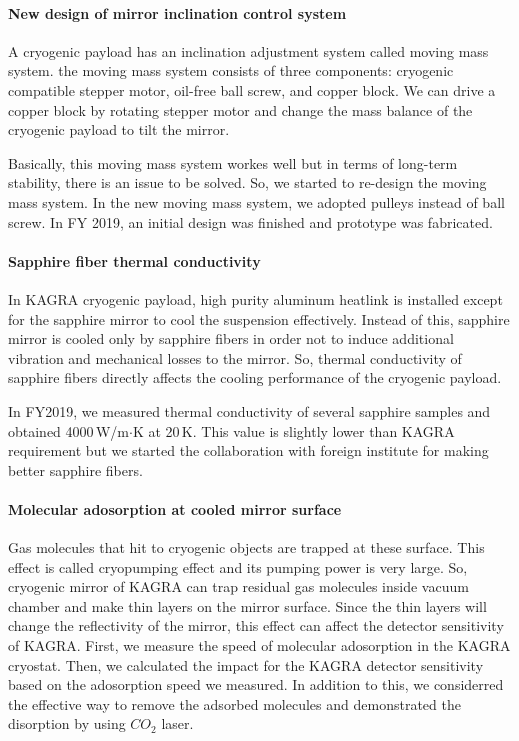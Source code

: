 \paragraph*{\bi New design of mirror inclination control system}
A cryogenic payload has an inclination adjustment system called moving mass system. the moving mass system consists of three components: cryogenic compatible stepper motor, oil-free ball screw, and copper block. We can drive a copper block by rotating stepper motor and change the mass balance of the cryogenic payload to tilt the mirror.

Basically, this moving mass system workes well but in terms of long-term stability, there is an issue to be solved. So, we started to re-design the moving mass system. In the new moving mass system, we adopted pulleys instead of ball screw. In FY 2019, an initial design was finished and prototype was fabricated.

\paragraph*{\bi Sapphire fiber thermal conductivity}
In KAGRA cryogenic payload, high purity aluminum heatlink is installed except for the sapphire mirror to cool the suspension effectively. Instead of this, sapphire mirror is cooled only by sapphire fibers in order not to induce additional vibration and mechanical losses to the mirror. So, thermal conductivity of sapphire fibers directly affects the cooling performance of the cryogenic payload.

In FY2019, we measured thermal conductivity of several sapphire samples and obtained 4000\,W/m$\cdot$K at 20\,K. This value is slightly lower than KAGRA requirement but we started the collaboration with foreign institute for making better sapphire fibers.

\paragraph*{\bi Molecular adosorption at cooled mirror surface}
Gas molecules that hit to cryogenic objects are trapped at these surface. This effect is called cryopumping effect and its pumping power is very large. So, cryogenic mirror of KAGRA can trap residual gas molecules inside vacuum chamber and make thin layers on the mirror surface. Since the thin layers will change the reflectivity of the mirror, this effect can affect the detector sensitivity of KAGRA.
First, we measure the speed of molecular adosorption in the KAGRA cryostat. Then, we calculated the impact for the KAGRA detector sensitivity based on the adosorption speed we measured. In addition to this, we considerred the effective way to remove the adsorbed molecules and demonstrated the disorption by using $CO_2$ laser.

